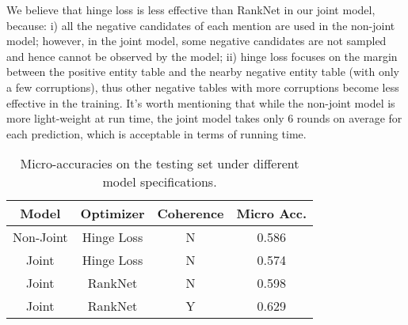 We believe that hinge loss is less effective than RankNet in our joint model,
because: i) all the negative candidates of each mention are used in the 
non-joint model; however, in the joint model, 
some negative candidates are not sampled and hence cannot be observed by the model;
ii) hinge loss focuses on the margin between the positive entity table 
and the nearby negative entity table (with only a few corruptions),
thus other negative tables with more corruptions become less effective
in the training.
It's worth mentioning that while the non-joint model is more 
light-weight at run time, the joint model takes only 6 rounds on average
for each prediction, which is acceptable in terms of running time.




\begin{table}[ht]
	\small
    \centering
    \caption{Micro-accuracies on the testing set under different model specifications.}
    \label{tab:ablation-joint}
    \begin{tabular} {c|c|c|c}
        \hline
        Model       & Optimizer     & Coherence  &  Micro Acc.   \\
        \hline
        Non-Joint   & Hinge Loss    & N     & 0.586         \\
        Joint       & Hinge Loss    & N     & 0.574         \\
        Joint       & RankNet       & N     & 0.598         \\
        Joint       & RankNet       & Y     & 0.629         \\
        \hline
    \end{tabular}
\end{table}



%
%
%

